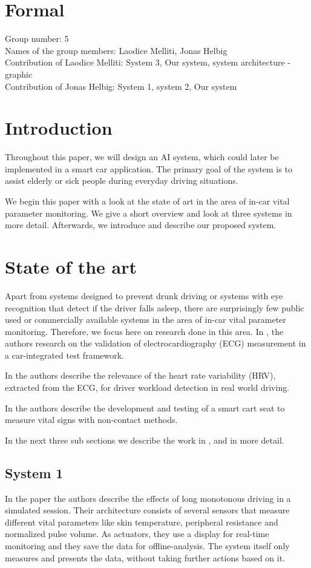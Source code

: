 \section{Formal}
Group number: 5\\
Names of the group members: Laodice Melliti, Jonas Helbig\\
Contribution of Laodice Melliti: System 3, Our system, system architecture - graphic\\
Contribution of Jonas Helbig: System 1, system 2, Our system \\
\section{Introduction}
\indent					%
\indent Throughout this paper, we will design an AI system, which could later be implemented in a smart car application. The primary goal of the system is to assist elderly or sick people during everyday driving situations.

We begin this paper with a look at  the state of art in the area of in-car vital parameter monitoring. We give a short overview and look at three systems in more detail. Afterwards, we introduce and describe our proposed system.
\section{State of the art}
\indent
\indent Apart from systems designed to prevent drunk driving or systems with eye recognition that detect if the driver falls asleep, there are surprisingly few public used or commercially available systems in the area of in-car vital parameter monitoring. Therefore, we focus here on research done in this area. In \cite{schneider:12}, the authors research on the validation of electrocardiography (ECG) measurement in a car-integrated test framework.

In \cite{eilebrecht:12} the authors describe the relevance of the heart rate variability (HRV), extracted from the ECG, for driver workload detection in real world driving.

In \cite{walter:11} the authors describe the development and testing of a smart cart seat to measure vital signs with non-contact methods.

In the next three sub sections we describe the work in \cite{yamakoshi:07}, \cite{Zocchi:07} and \cite{angelo:10} in more detail.
\subsection{System 1}
\indent
\indent In the paper \cite{yamakoshi:07} the authors describe the effects of long monotonous driving in a simulated session. Their architecture consists of several sensors that measure different vital parameters like skin temperature, peripheral resistance and normalized pulse volume. As actuators, they use a display for real-time monitoring and they save the data for offline-analysis.
The system itself only measures and presents the data, without taking further actions based on it.
